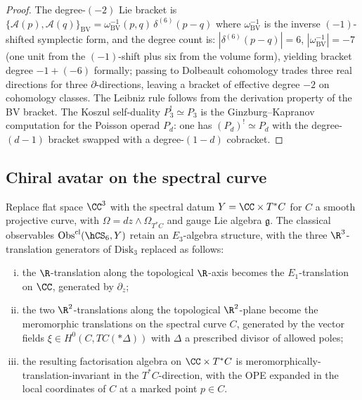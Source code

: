 \begin{proof}
The degree-$(-2)$ Lie bracket is $\{\mathcal{A}(p),\mathcal{A}(q)\}_{\mathrm{BV}} = \omega_{\mathrm{BV}}^{-1}(p,q)\,\delta^{(6)}(p-q)$ where
$\omega_{\mathrm{BV}}^{-1}$ is the inverse $(-1)$-shifted symplectic
form, and the degree count is:
$|\delta^{(6)}(p-q)|=6$, $|\omega_{\mathrm{BV}}^{-1}|=-7$ (one unit
from the $(-1)$-shift plus six from the volume form), yielding bracket
degree $-1 + (-6)$ formally; passing to Dolbeault cohomology trades
three real directions for three $\partial$-directions, leaving a
bracket of effective degree $-2$ on cohomology classes. The
Leibniz rule follows from the derivation property of the BV bracket.
The Koszul self-duality $P_3^!\simeq P_3$ is the Ginzburg--Kapranov
computation for the Poisson operad $P_d$: one has
$(P_d)^!\simeq P_{d}$ with the degree-$(d-1)$ bracket swapped with a
degree-$(1-d)$ cobracket.
\end{proof}

\subsection{Chiral avatar on the spectral curve}
\label{subsec:E3-chiral-avatar}

\begin{theorem}
\label{thm:E3-chiral-avatar}
Replace flat space $\CC^3$ with the spectral datum $Y = \CC \times T^*C$
for $C$ a smooth projective curve, with $\Omega = dz\wedge\Omega_{T^*C}$
and gauge Lie algebra $\mathfrak{g}$. The classical observables
$\mathrm{Obs}^{\mathrm{cl}}(\hCS_6,Y)$ retain an $E_3$-algebra
structure, with the three $\R^3$-translation generators of
$\mathrm{Disk}_3$ replaced as follows:
\begin{enumerate}[(i)]
\item the $\R$-translation along the topological $\R$-axis becomes
the $E_1$-translation on $\CC$, generated by $\partial_z$;
\item the two $\R^2$-translations along the topological $\R^2$-plane
become the meromorphic translations on the spectral curve $C$,
generated by the vector fields $\xi\in H^0(C,TC(*\Delta))$ with
$\Delta$ a prescribed divisor of allowed poles;
\item the resulting factorisation algebra on $\CC\times T^*C$ is
meromorphically-translation-invariant in the $T^*C$-direction, with
the OPE expanded in the local coordinates of $C$ at a marked point
$p\in C$.
\end{enumerate}
\end{theorem}

